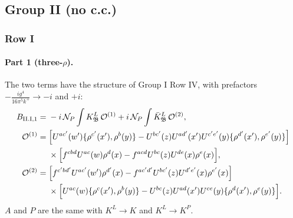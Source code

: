 \documentclass[10pt]{article}
\numberwithin{equation}{section}
\newcommand{\NP}{\mathcal N_{P}}
\begin{document}
\subsection{Group II (no c.c.)}
\subsubsection{Row I}
\paragraph{Part 1 (three-$\rho$).} The two terms have the structure of Group I Row IV, with prefactors $-\frac{ig^4}{16\pi^5k^+}\to-i$ and $+i$:
\begin{align}
B_{\rm II.I,1}={}&-i\,\NP\int K^L_{\mathfrak B}\,\mathcal O^{(1)}+i\,\NP\int\bar K^L_{\mathfrak B}\,\mathcal O^{(2)},\notag\\
\mathcal O^{(1)}={}&\Big[U^{ac'}(w')\{\rho^{c'}(x'),\rho^b(y)\}-U^{bc'}(z)U^{ad'}(x')U^{c'e'}(y)\{\rho^{d'}(x'),\rho^{e'}(y)\}\Big]\notag\\
&\times\Big[f^{cbd}U^{ac}(w)\rho^d(x)-f^{acd}U^{bc}(z)U^{de}(x)\rho^e(x)\Big],\notag\\
\mathcal O^{(2)}={}&\Big[f^{c'bd'}U^{ac'}(w')\rho^{d'}(x)-f^{ac'd'}U^{bc'}(z)U^{d'e'}(x)\rho^{e'}(x)\Big]\notag\\
&\times\Big[U^{ac}(w)\{\rho^c(x'),\rho^b(y)\}-U^{bc}(z)U^{ad}(x')U^{ce}(y)\{\rho^d(x'),\rho^e(y)\}\Big].
\end{align}
$A$ and $P$ are the same with $K^L\to K$ and $K^L\to K^P$.
\end{document}
